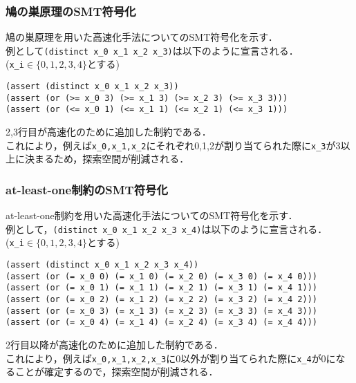 \documentclass [dvipdfmx,11pt]{beamer}
\begin{document}
\begin{frame}[fragile]\small
    \frametitle{鳩の巣原理のSMT符号化}
    鳩の巣原理を用いた高速化手法についてのSMT符号化を示す．\\
    例として\verb|(distinct x_0 x_1 x_2 x_3)|は以下のように宣言される．\\
    (\verb|x_i|$\in \{0,1,2,3,4\}$とする)
    \begin{exampleblock}{}\scriptsize
\begin{verbatim}
(assert (distinct x_0 x_1 x_2 x_3))
(assert (or (>= x_0 3) (>= x_1 3) (>= x_2 3) (>= x_3 3)))
(assert (or (<= x_0 1) (<= x_1 1) (<= x_2 1) (<= x_3 1)))
\end{verbatim}
    \end{exampleblock}
    2,3行目が高速化のために追加した制約である．\\
    これにより，例えば\verb|x_0,x_1,x_2|にそれぞれ0,1,2が割り当てられた際に\verb|x_3|が3以上に決まるため，探索空間が削減される．
\end{frame}


\begin{frame}[fragile]\small
    \frametitle{at-least-one制約のSMT符号化}
    at-least-one制約を用いた高速化手法についてのSMT符号化を示す．\\
    例として，\verb|(distinct x_0 x_1 x_2 x_3 x_4)|は以下のように宣言される．\\
    (\verb|x_i|$\in \{0,1,2,3,4\}$とする)
    \begin{exampleblock}{}\scriptsize
\begin{verbatim}
(assert (distinct x_0 x_1 x_2 x_3 x_4))
(assert (or (= x_0 0) (= x_1 0) (= x_2 0) (= x_3 0) (= x_4 0)))
(assert (or (= x_0 1) (= x_1 1) (= x_2 1) (= x_3 1) (= x_4 1)))
(assert (or (= x_0 2) (= x_1 2) (= x_2 2) (= x_3 2) (= x_4 2)))
(assert (or (= x_0 3) (= x_1 3) (= x_2 3) (= x_3 3) (= x_4 3)))
(assert (or (= x_0 4) (= x_1 4) (= x_2 4) (= x_3 4) (= x_4 4)))
\end{verbatim}
    \end{exampleblock}
    2行目以降が高速化のために追加した制約である．\\
    これにより，例えば\verb|x_0,x_1,x_2,x_3|に0以外が割り当てられた際に\verb|x_4|が0になることが確定するので，探索空間が削減される．
\end{frame}
\end{document}
